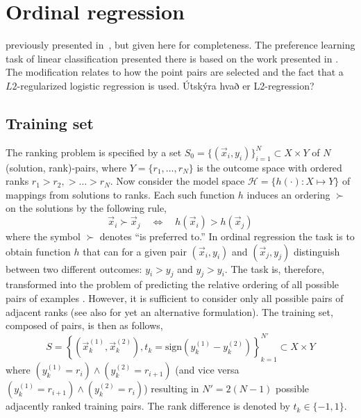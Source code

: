 
\chapter{Ordinal regression}\label{ch:ordinal} 

 previously presented in~\cite{Ru06:PPSN}, but given here for completeness. The preference learning task of linear classification presented there is based on the work presented in \citep{liblinear,Lin08:newtontrustregion}. The modification relates to how the point pairs are selected and the fact that a $L2$-regularized logistic regression is used. {\color{red}Útskýra hvað er L2-regression?}

\section{Training set}
The ranking problem is specified by a set $S_{0} = \{(\vec{x}_i,y_i)\}_{i=1}^N \subset X \times Y$ of $N$ (solution, rank)-pairs, where $Y=\{r_1,\ldots,r_N\}$ is the outcome space with ordered ranks $r_1> r_2,> \ldots > r_N$.  
Now consider the model space $\mathcal{H} = \{h(\cdot) : X \mapsto Y\}$ of mappings from solutions to ranks. Each such function $h$ induces an ordering $\succ$ on the solutions  by the following rule,
\begin{equation}\label{eq:linear}
\vec{x}_i \succ \vec{x}_j \quad \Leftrightarrow \quad h(\vec{x}_i) > h(\vec{x}_j)
\end{equation}
where the symbol $\succ$ denotes ``is preferred to.''  In ordinal regression the task is to obtain function $h$ that can for a given pair $(\vec{x}_i,y_i)$ and $(\vec{x}_j,y_j)$ distinguish between two different outcomes: $y_i > y_j$ and $y_j > y_i$. The task is, therefore, transformed into the problem of predicting the relative ordering of all possible pairs of examples \citep{Herbrich00,Joachims02}.  However, it is sufficient to consider only all possible pairs of adjacent ranks (see also \cite{ShaweTaylor04:book} for yet an alternative formulation).  The training set, composed of pairs, is then as follows,
\begin{equation}
S = \left\{(\vec{x}_k^{(1)}, \vec{x}_k^{(2)}),t_k=\text{sign}(y_k^{(1)} - y_k^{(2)})\right\}_{k=1}^{N'} \subset X\times Y  \label{eq:S}
\end{equation}
where $(y_k^{(1)} = r_i) \wedge (y_k^{(2)} = r_{i+1})$ (and vice versa $(y_k^{(1)} = r_{i+1}) \wedge (y_k^{(2)} = r_{i})$) resulting in $N'=2(N-1)$ possible adjacently ranked training pairs. The rank difference is denoted by $t_k\in\{-1,1\}$.

